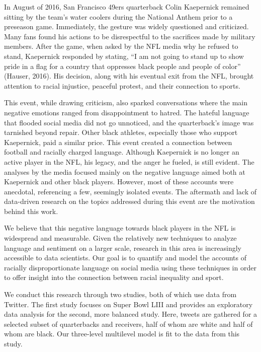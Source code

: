 \documentclass[12pt,twoside]{reedthesis}
\begin{document}
In August of 2016, San Francisco 49ers quarterback Colin Kaepernick
remained sitting by the team's water coolers during the National Anthem
prior to a preseason game. Immediately, the gesture was widely
questioned and criticized. Many fans found his actions to be
disrespectful to the sacrifices made by military members. After the
game, when asked by the NFL media why he refused to stand, Kaepernick
responded by stating, ``I am not going to stand up to show pride in a
flag for a country that oppresses black people and people of color''
(Hauser, 2016). His decision, along with his eventual exit from the NFL,
brought attention to racial injustice, peaceful protest, and their
connection to sports.

This event, while drawing criticism, also sparked conversations where
the main negative emotions ranged from disappointment to hatred. The
hateful language that flooded social media did not go unnoticed, and the
quarterback's image was tarnished beyond repair. Other black athletes,
especially those who support Kaepernick, paid a similar price. This
event created a connection between football and racially charged
language. Although Kaepernick is no longer an active player in the NFL,
his legacy, and the anger he fueled, is still evident. The analyses by
the media focused mainly on the negative language aimed both at
Kaepernick and other black players. However, most of these accounts were
anecdotal, referencing a few, seemingly isolated events. The aftermath
and lack of data-driven research on the topics addressed during this
event are the motivation behind this work.

We believe that this negative language towards black players in the NFL
is widespread and measurable. Given the relatively new techniques to
analyze language and sentiment on a larger scale, research in this area
is increasingly accessible to data scientists. Our goal is to quantify
and model the accounts of racially disproportionate language on social
media using these techniques in order to offer insight into the
connection between racial inequality and sport.

We conduct this research through two studies, both of which use data
from Twitter. The first study focuses on Super Bowl LIII and provides an
exploratory data analysis for the second, more balanced study. Here,
tweets are gathered for a selected subset of quarterbacks and receivers,
half of whom are white and half of whom are black. Our three-level
multilevel model is fit to the data from this study.
\end{document}
